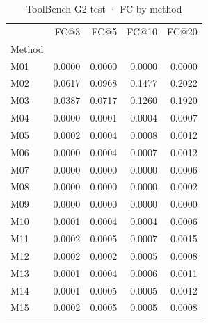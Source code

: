 \begin{table}
\caption{ToolBench G2 test · FC by method}
\label{tab:ToolBench-G2-test-comparison-comparison-fullcoverage}
\begin{tabular}{lrrrr}
\toprule
 & FC@3 & FC@5 & FC@10 & FC@20 \\
Method &  &  &  &  \\
\midrule
M01 & 0.0000 & 0.0000 & 0.0000 & 0.0000 \\
M02 & 0.0617 & 0.0968 & 0.1477 & 0.2022 \\
M03 & 0.0387 & 0.0717 & 0.1260 & 0.1920 \\
M04 & 0.0000 & 0.0001 & 0.0004 & 0.0007 \\
M05 & 0.0002 & 0.0004 & 0.0008 & 0.0012 \\
M06 & 0.0000 & 0.0004 & 0.0007 & 0.0012 \\
M07 & 0.0000 & 0.0000 & 0.0000 & 0.0006 \\
M08 & 0.0000 & 0.0000 & 0.0000 & 0.0002 \\
M09 & 0.0000 & 0.0000 & 0.0000 & 0.0000 \\
M10 & 0.0001 & 0.0004 & 0.0004 & 0.0006 \\
M11 & 0.0002 & 0.0005 & 0.0007 & 0.0015 \\
M12 & 0.0002 & 0.0002 & 0.0005 & 0.0008 \\
M13 & 0.0001 & 0.0004 & 0.0006 & 0.0011 \\
M14 & 0.0001 & 0.0005 & 0.0005 & 0.0012 \\
M15 & 0.0002 & 0.0005 & 0.0005 & 0.0008 \\
\bottomrule
\end{tabular}
\end{table}
